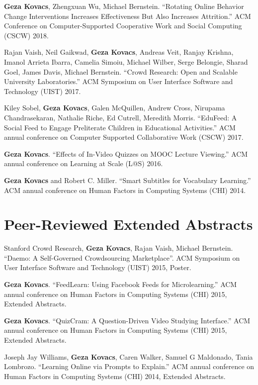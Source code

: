 \documentclass[margin,line]{resume}
\begin{document}
\begin{resume}
\textbf{Geza Kovacs}, Zhengxuan Wu, Michael Bernstein. ``Rotating Online Behavior Change Interventions Increases Effectiveness But Also Increases Attrition.'' ACM Conference on Computer-Supported Cooperative Work and Social Computing (CSCW) 2018. %

Rajan Vaish, Neil Gaikwad, \textbf{Geza Kovacs}, Andreas Veit, Ranjay Krishna, Imanol Arrieta Ibarra, Camelia Simoiu, Michael Wilber, Serge Belongie, Sharad Goel, James Davis, Michael Bernstein. ``Crowd Research: Open and Scalable University Laboratories.'' ACM Symposium on User Interface Software and Technology (UIST) 2017. %

Kiley Sobel, \textbf{Geza Kovacs}, Galen McQuillen, Andrew Cross, Nirupama Chandrasekaran, Nathalie Riche, Ed Cutrell, Meredith Morris. ``EduFeed: A Social Feed to Engage Preliterate Children in Educational Activities.'' ACM annual conference on Computer Supported Collaborative Work (CSCW) 2017. %

\textbf{Geza Kovacs}. ``Effects of In-Video Quizzes on MOOC Lecture Viewing.'' ACM annual conference on Learning at Scale (L@S) 2016. %

\textbf{Geza Kovacs} and Robert C. Miller. ``Smart Subtitles for Vocabulary Learning.'' ACM annual conference on Human Factors in Computing Systems (CHI) 2014. %


\section{\mysidestyle Peer-Reviewed Extended Abstracts}

Stanford Crowd Research, \textbf{Geza Kovacs}, Rajan Vaish, Michael Bernstein. ``Daemo: A Self-Governed Crowdsourcing Marketplace''. ACM Symposium on User Interface Software and Technology (UIST) 2015, Poster.

\textbf{Geza Kovacs}. ``FeedLearn: Using Facebook Feeds for Microlearning.'' ACM annual conference on Human Factors in Computing Systems (CHI) 2015, Extended Abstracts. %

\textbf{Geza Kovacs}. ``QuizCram: A Question-Driven Video Studying Interface.'' ACM annual conference on Human Factors in Computing Systems (CHI) 2015, Extended Abstracts.

Joseph Jay Williams, \textbf{Geza Kovacs}, Caren Walker, Samuel G Maldonado, Tania Lombrozo. ``Learning Online via Prompts to Explain.'' ACM annual conference on Human Factors in Computing Systems (CHI) 2014, Extended Abstracts.


\end{resume}
\end{document}
